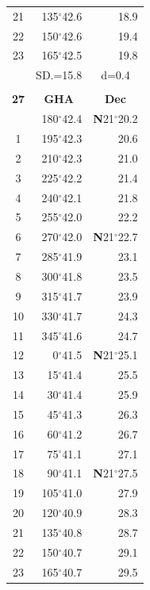\documentclass[10pt, a4paper]{report}
\begin{document}
\begin{scriptsize}
\begin{tabular*}{0.2\textwidth}[t]{@{\extracolsep{\fill}}|c|rr|}
21 & 135$^\circ$42.6 & \raisebox{0.24ex}{\boldmath$\cdot$~\boldmath$\cdot$~~}18.9\\
22 & 150$^\circ$42.6 & 19.4\\
23 & 165$^\circ$42.5 & 19.8\\
\hline
\rule{0pt}{2.4ex} & \multicolumn{1}{c}{SD.=15.8} & \multicolumn{1}{c|}{d=0.4}\\
\hline
\multicolumn{1}{c}{}\\[-0.5ex]\hline
\multicolumn{1}{|c|}{\rule{0pt}{2.6ex}\textbf{27}} & \multicolumn{1}{c}{\textbf{GHA}} & \multicolumn{1}{c|}{\textbf{Dec}}\\
\hline\rule{0pt}{2.6ex}\noindent
0 & 180$^\circ$42.4 & \textbf{N}21$^\circ$20.2\\
1 & 195$^\circ$42.3 & 20.6\\
2 & 210$^\circ$42.3 & 21.0\\
3 & 225$^\circ$42.2 & \raisebox{0.24ex}{\boldmath$\cdot$~\boldmath$\cdot$~~}21.4\\
4 & 240$^\circ$42.1 & 21.8\\
5 & 255$^\circ$42.0 & 22.2\\[2Pt]
6 & 270$^\circ$42.0 & \textbf{N}21$^\circ$22.7\\
7 & 285$^\circ$41.9 & 23.1\\
8 & 300$^\circ$41.8 & 23.5\\
9 & 315$^\circ$41.7 & \raisebox{0.24ex}{\boldmath$\cdot$~\boldmath$\cdot$~~}23.9\\
10 & 330$^\circ$41.7 & 24.3\\
11 & 345$^\circ$41.6 & 24.7\\[2Pt]
12 & 0$^\circ$41.5 & \textbf{N}21$^\circ$25.1\\
13 & 15$^\circ$41.4 & 25.5\\
14 & 30$^\circ$41.4 & 25.9\\
15 & 45$^\circ$41.3 & \raisebox{0.24ex}{\boldmath$\cdot$~\boldmath$\cdot$~~}26.3\\
16 & 60$^\circ$41.2 & 26.7\\
17 & 75$^\circ$41.1 & 27.1\\[2Pt]
18 & 90$^\circ$41.1 & \textbf{N}21$^\circ$27.5\\
19 & 105$^\circ$41.0 & 27.9\\
20 & 120$^\circ$40.9 & 28.3\\
21 & 135$^\circ$40.8 & \raisebox{0.24ex}{\boldmath$\cdot$~\boldmath$\cdot$~~}28.7\\
22 & 150$^\circ$40.7 & 29.1\\
23 & 165$^\circ$40.7 & 29.5\\

\end{tabular*}
\end{scriptsize}
\end{document}
